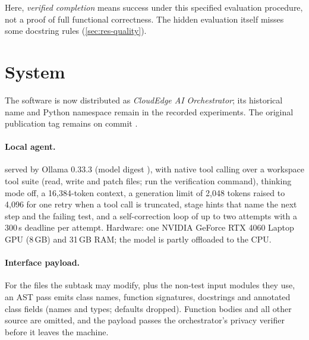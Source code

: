 \documentclass[11pt]{article}
\begin{document}
Here, \emph{verified completion} means success under this specified evaluation procedure, not a proof of full functional correctness. The hidden evaluation itself misses some docstring rules (\cref{sec:res-quality}).

\section{System}\label{sec:system}
The software is now distributed as \emph{CloudEdge AI Orchestrator}; its historical name and Python namespace remain in the recorded experiments. The original publication tag  remains on commit .
\paragraph{Local agent.}  served by Ollama 0.33.3 (model digest ), with native tool calling over a workspace tool suite (read, write and patch files; run the verification command), thinking mode off, a 16{,}384-token context, a generation limit of 2{,}048 tokens raised to 4{,}096 for one retry when a tool call is truncated, stage hints that name the next step and the failing test, and a self-correction loop of up to two attempts with a 300\,s deadline per attempt. Hardware: one NVIDIA GeForce RTX 4060 Laptop GPU (8\,GB) and 31\,GB RAM; the model is partly offloaded to the CPU.

\paragraph{Interface payload.} For the files the subtask may modify, plus the non-test input modules they use, an AST pass emits class names, function signatures, docstrings and annotated class fields (names and types; defaults dropped). Function bodies and all other source are omitted, and the payload passes the orchestrator's privacy verifier before it leaves the machine.
\end{document}

